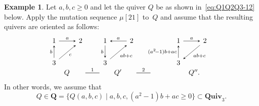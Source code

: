 \documentclass[11pt, letterpaper]{amsart}
\theoremstyle{definition}
\newtheorem{example}[theorem]{Example}
\numberwithin{equation}{section}
\def\Quiv {{\mathbf{Quiv}}}
\newcommand{\mutation}[1]{\stackrel{#1}{\rule[.5ex]{2em}{0.5pt}}}
\begin{document}
\begin{example}
\label{eg:Q1Q3}
Let $a,b,c\ge0$ and let the quiver $Q$ be as shown in~\eqref{eq:Q1Q2Q3-12} below. 
Apply the mutation sequence $\mu[21]$ to~$Q$ and assume that the resulting quivers are oriented as follows: 
\begin{equation}
\label{eq:Q1Q2Q3-12}
\!\!\!\!\begin{array}{ccccccc}
\begin{tikzcd}[arrows={-stealth}]
  1 \arrow[r, "a"]  
  & 2 
  \\
  3 \arrow[u,"b"] \arrow[ur, swap, "c" ] &
\end{tikzcd}
& &
\begin{tikzcd}[arrows={-stealth}]
  1    \arrow[d, swap, "b"] 
  & 2 \arrow[l, swap, "a" ]  
  \\
   3 \arrow[ur, swap, "ab+c"] &
\end{tikzcd}
& &
\!\begin{tikzcd}[arrows={-stealth}]
  1    \arrow[r, "a"]
  & 2  \arrow[dl, "ab+c" ] 
  \\
   3 \arrow[u, "\!\!\!(a^2\!-1)b+ac"] &
\end{tikzcd}
\\
Q
& \!\!\!\!\!\!\mutation{1}\!\!\!\!\!\!
& Q'
& \!\!\!\!\!\!\mutation{2}\!\!\!\!\!\!
& \qquad\qquad Q''.
\end{array}
\end{equation}
In other words, we assume that 
\begin{equation*}
Q\in \mathbf{Q} = \{ Q(a,b,c) \mid a,b,c, (a^2-1)b+ac\ge 0\} \subset\Quiv_3. 
\end{equation*}



\end{example}
\end{document}
